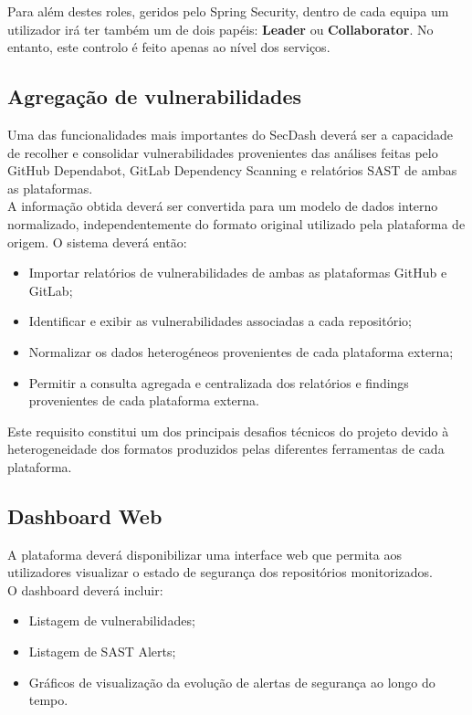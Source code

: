 Para além destes roles, geridos pelo Spring Security, dentro de cada equipa um utilizador irá ter também um de dois papéis: \textbf{Leader} ou \textbf{Collaborator}. No entanto, este controlo é feito apenas ao nível dos serviços. \\

\subsection{Agregação de vulnerabilidades}

Uma das funcionalidades mais importantes do SecDash deverá ser a capacidade de recolher e consolidar vulnerabilidades provenientes das análises feitas pelo GitHub Dependabot, GitLab Dependency Scanning e relatórios SAST de ambas as plataformas.\\

A informação obtida deverá ser convertida para um modelo de dados interno normalizado, independentemente do formato original utilizado pela plataforma de origem. O sistema deverá então:
\begin{itemize}
	\item Importar relatórios de vulnerabilidades de ambas as plataformas GitHub e GitLab;
	\item Identificar e exibir as vulnerabilidades associadas a cada repositório;
	\item Normalizar os dados heterogéneos provenientes de cada plataforma externa;
	\item Permitir a consulta agregada e centralizada dos relatórios e findings provenientes de cada plataforma externa.
\end{itemize}

Este requisito constitui um dos principais desafios técnicos do projeto devido à heterogeneidade dos formatos produzidos pelas diferentes ferramentas de cada plataforma. \\

\subsection{Dashboard Web}

A plataforma deverá disponibilizar uma interface web que permita aos utilizadores visualizar o estado de segurança dos repositórios monitorizados.\\

O dashboard deverá incluir:
\begin{itemize}
	\item Listagem de vulnerabilidades;
	\item Listagem de SAST Alerts;
	\item Gráficos de visualização da evolução de alertas de segurança ao longo do tempo.
\end{itemize}

